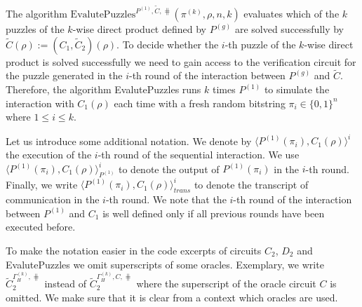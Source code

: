 %
%
The algorithm $\text{EvalutePuzzles}^{P^{(1)}, \widetilde{C}, \hash}(\pi^{(k)}, \rho, n, k)$
evaluates which of the $k$ puzzles of the $k$-wise direct product defined by $P^{(g)}$ are solved successfully by $\widetilde{C}(\rho) := (C_1,\widetilde{C}_2)(\rho)$.
To decide whether the $i$-th puzzle of the $k$-wise direct product is solved successfully we need to gain access to the verification circuit
for the puzzle generated in the $i$-th round of the interaction between $P^{(g)}$ and $\widetilde{C}$.
Therefore, the algorithm EvalutePuzzles runs $k$ times $P^{(1)}$ to simulate the interaction with
$C_1(\rho)$ each time with a fresh random bitstring $\pi_i \in \{0,1\}^{n}$ where $1 \leq i \leq k$.

Let us introduce some additional notation.
We denote by $\langle P^{(1)}(\pi_i), C_1(\rho)\rangle^i$ the execution of the $i$-th round of the sequential interaction.
We use $\langle P^{(1)}(\pi_i), C_1(\rho)\rangle^i_{P^{(1)}}$ to denote the output of $P^{(1)}(\pi_i)$ in the $i$-th round.
Finally, we write $\langle P^{(1)}(\pi_i), C_1(\rho)\rangle^i_{\mathit{trans}}$ to denote the transcript of communication in the $i$-th round.
We note that the $i$-th round of the interaction between $P^{(1)}$ and $C_1$ is well defined only if all previous rounds have been executed before.

To make the notation easier in the code excerpts of circuits $C_2$, $D_2$ and EvalutePuzzles we
omit superscripts of some oracles. Exemplary, we write $\widetilde{C}_2^{\Gamma_H^{(k)}, \hash}$ instead of $\widetilde{C}_2^{\Gamma_H^{(k)}, C, \hash}$ where
the superscript of the oracle circuit $C$ is omitted. We make sure that it is clear from a context which oracles are used.

